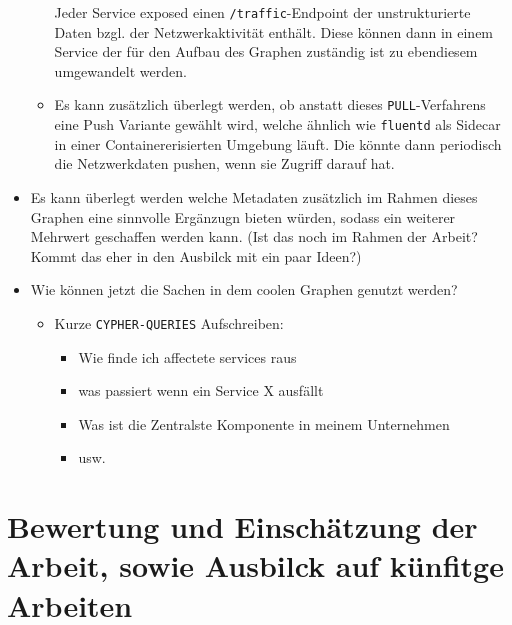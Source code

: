 \documentclass[
	12pt,
	BCOR=5mm,
	DIV=12,
	headinclude=on,
	footinclude=off,
	parskip=half,
	bibliography=totoc,
	listof=entryprefix,
	toc=listof,
	numbers=noenddot,
	plainfootsepline
]{scrreprt}
\begin{document}
\begin{itemize}
\begin{itemize}
		Jeder Service exposed einen \texttt{/traffic}-Endpoint der unstrukturierte Daten bzgl. der Netzwerkaktivität enthält. Diese können dann in einem Service der für den Aufbau des Graphen zuständig ist zu ebendiesem umgewandelt werden.
		\item Es kann zusätzlich überlegt werden, ob anstatt dieses \texttt{PULL}-Verfahrens eine Push Variante gewählt wird, welche ähnlich wie \texttt{fluentd} als Sidecar in einer Containererisierten Umgebung läuft. Die könnte dann periodisch die Netzwerkdaten pushen, wenn sie Zugriff darauf hat.
	\end{itemize}
	\item Es kann überlegt werden welche Metadaten zusätzlich im Rahmen dieses Graphen eine sinnvolle Ergänzugn bieten würden, sodass ein weiterer Mehrwert geschaffen werden kann. (Ist das noch im Rahmen der Arbeit? Kommt das eher in den Ausbilck mit ein paar Ideen?)
	\item Wie können jetzt die Sachen in dem coolen Graphen genutzt werden?
	\begin{itemize}
		\item Kurze \texttt{CYPHER-QUERIES} Aufschreiben:
		\begin{itemize}
			\item Wie finde ich affectete services raus
			\item was passiert wenn ein Service X ausfällt
			\item Was ist die Zentralste Komponente in meinem Unternehmen
			\item usw.
		\end{itemize}
	\end{itemize}
\end{itemize}

\chapter{Bewertung und Einschätzung der Arbeit, sowie Ausbilck auf künfitge Arbeiten}
\clearpage
\ihead{}
\printbibliography[title=Literaturverzeichnis]
\cleardoublepage



\end{document}
